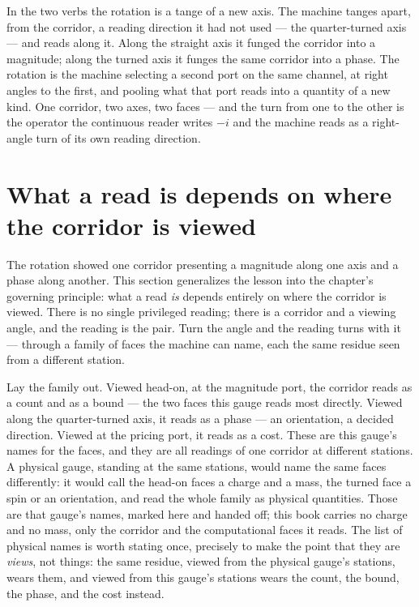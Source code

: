 In the two verbs the rotation is a tange of a new axis. The machine tanges apart, from the corridor, a reading direction
it had not used --- the quarter-turned axis --- and reads along it. Along the straight axis it funged the corridor into a
magnitude; along the turned axis it funges the same corridor into a phase. The rotation is the machine selecting a second
port on the same channel, at right angles to the first, and pooling what that port reads into a quantity of a new kind.
One corridor, two axes, two faces --- and the turn from one to the other is the operator the continuous reader writes
$-i$ and the machine reads as a right-angle turn of its own reading direction.

\section{What a read is depends on where the corridor is viewed}

The rotation showed one corridor presenting a magnitude along one axis and a phase along another. This section
generalizes the lesson into the chapter's governing principle: what a read \emph{is} depends entirely on where the
corridor is viewed. There is no single privileged reading; there is a corridor and a viewing angle, and the reading is
the pair. Turn the angle and the reading turns with it --- through a family of faces the machine can name, each the same
residue seen from a different station.

Lay the family out. Viewed head-on, at the magnitude port, the corridor reads as a count and as a bound --- the two
faces this gauge reads most directly. Viewed along the quarter-turned axis, it reads as a phase --- an orientation, a
decided direction. Viewed at the pricing port, it reads as a cost. These are this gauge's names for the faces, and they
are all readings of one corridor at different stations. A physical gauge, standing at the same stations, would name the
same faces differently: it would call the head-on faces a charge and a mass, the turned face a spin or an orientation,
and read the whole family as physical quantities. Those are that gauge's names, marked here and handed off; this book
carries no charge and no mass, only the corridor and the computational faces it reads. The list of physical names is
worth stating once, precisely to make the point that they are \emph{views}, not things: the same residue, viewed from
the physical gauge's stations, wears them, and viewed from this gauge's stations wears the count, the bound, the phase,
and the cost instead.

